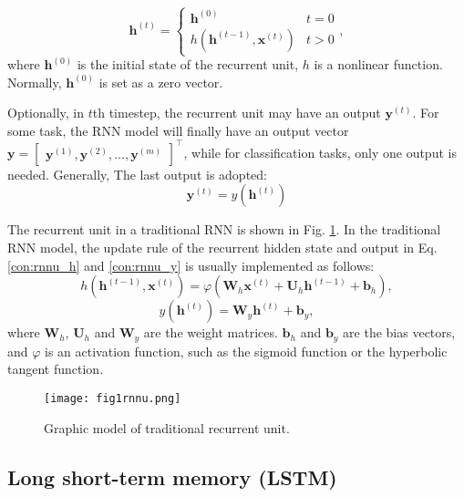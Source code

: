\documentclass[conference]{IEEEtran}
\begin{document}
\begin{equation} 
   \mathbf{h}^{(t)}=\left\{
    \begin{matrix}
       \mathbf{h}^{(0)} & t=0\\ 
       h(\mathbf{h}^{(t-1)},\mathbf{x}^{(t)}) & t>0
    \end{matrix}\right.,
       \label{con:rnnu_h}
\end{equation}
where {$\mathbf{h}^{(0)}$} is the initial state of the recurrent unit, {$h$} is a
nonlinear function. Normally, {$\mathbf{h}^{(0)}$} is set as a zero vector.

Optionally, in $t$th timestep, the recurrent unit may have an output
$\mathbf{y}^{(t)}$. For some task, the RNN model will finally have an output vector
{$\mathbf{y}={\begin{bmatrix}\mathbf{y}^{(1)},\mathbf{y}^{(2)},...,\mathbf{y}^{(m)}
\end{bmatrix}}^{\top}$}, while for classification tasks, only one output is needed.
Generally, The last output is adopted:
\begin{equation} 
    \mathbf{y}^{(t)}=y(\mathbf{h}^{(t)})
    \label{con:rnnu_y}
\end{equation}

The recurrent unit in a traditional RNN is shown in Fig. \ref{fig:rnnu}. In the
traditional RNN model, the update rule of the recurrent hidden state and output in
Eq. \eqref{con:rnnu_h} and \eqref{con:rnnu_y} is usually implemented as follows:
\begin{equation} 
    h(\mathbf{h}^{(t-1)},\mathbf{x}^{(t)})= \varphi (\mathbf{W}_h\mathbf{x}^{(t)}+\mathbf{U}_h\mathbf{h}^{(t-1)}+\mathbf{b}_h) ,
    \label{con:rnn_tra_h}
\end{equation}
\begin{equation} 
    y(\mathbf{h}^{(t)})= \mathbf{W}_y\mathbf{h}^{(t)}+\mathbf{b}_y ,
    \label{con:rnn_tra_y}
\end{equation}
where $\mathbf{W}_h$, $\mathbf{U}_h$ and $\mathbf{W}_y$ are the weight matrices.
$\mathbf{b}_h$ and $\mathbf{b}_y$ are the bias vectors, and $\varphi$ is an activation
function, such as the sigmoid function or the hyperbolic tangent function.

\begin{figure}[htbp]
    \centerline{\texttt{[image: fig1rnnu.png]}}
    \caption{Graphic model of traditional recurrent unit.}
    \label{fig:rnnu}
\end{figure}

\subsection{Long short-term memory (LSTM)}
\end{document}
